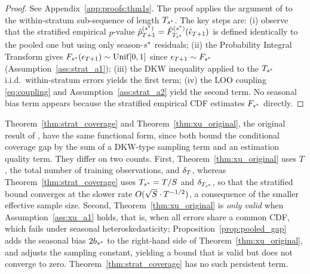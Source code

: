 \begin{proof}
  See Appendix~\ref{app:proofs:thm1s}.  The proof applies the
  argument of \citet[Theorem~1]{xu2023conformal} to the
  within-stratum sub-sequence of length $T_{s^*}$.  The key steps
  are: (i) observe that the stratified empirical $p$-value
  $\hat{p}_{T+1}^{(s^*)} = \hat{F}_{T_{s^*}}^{(s^*)}(\hat{\epsilon}_{T+1})$
  is defined identically to the pooled one but using only
  season-$s^*$ residuals; (ii) the Probability Integral
  Transform gives $F_{s^*}(\epsilon_{T+1}) \sim \mathrm{Unif}[0,1]$
  since $\epsilon_{T+1} \sim F_{s^*}$
  (Assumption~\ref{ass:strat_a1}); (iii) the DKW inequality
  \citep{massart1990tight} applied to the $T_{s^*}$ i.i.d.\
  within-stratum errors yields the first term; (iv) the LOO
  coupling \eqref{eq:coupling} and Assumption~\ref{ass:strat_a2}
  yield the second term.  No seasonal bias term appears because
  the stratified empirical CDF estimates $F_{s^*}$ directly.
\end{proof}

\begin{remark}
\label{rem:compare_theorems}
Theorem~\ref{thm:strat_coverage} and Theorem~\ref{thm:xu_original},
the original result of \citet{xu2023conformal}, have the same
functional form, since both bound the conditional coverage gap by
the sum of a DKW-type sampling term and an estimation quality term.
They differ on two counts.  First, Theorem~\ref{thm:xu_original}
uses $T$, the total number of training observations, and $\delta_T$,
whereas Theorem~\ref{thm:strat_coverage} uses $T_{s^*} = T/S$ and
$\delta_{T_{s^*}}$, so that the stratified bound converges at the slower
rate $O(\sqrt{S}\cdot T^{-1/2})$, a consequence of the smaller
effective sample size.  Second, Theorem~\ref{thm:xu_original} is
\emph{only valid} when Assumption~\ref{ass:xu_a1} holds, that is,
when all errors share a common CDF, which fails under seasonal
heteroskedasticity; Proposition~\ref{prop:pooled_gap} adds the
seasonal bias $2b_{s^*}$ to the right-hand side of
Theorem~\ref{thm:xu_original}, and adjusts the sampling constant,
yielding a bound that is valid but does not converge to zero.
Theorem~\ref{thm:strat_coverage} has no such persistent term.
\end{remark}

